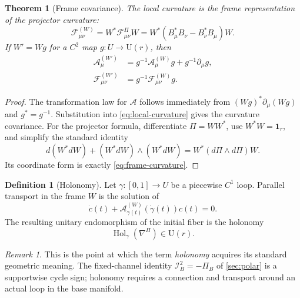 \documentclass[11pt,reqno]{scrartcl}
\newcommand{\idop}{\mathbf 1}
\newcommand{\gaugeA}{\mathcal A}
\newcommand{\gaugeF}{\mathcal F}
\theoremstyle{plain}
\newtheorem{theorem}{Theorem}[section]
\theoremstyle{definition}
\newtheorem{definition}[definition]{Definition}
\theoremstyle{remark}
\newtheorem{remark}[remark]{Remark}
\begin{document}
\begin{theorem}[Frame covariance]
\label{thm:frame-covariance}
The local curvature is the frame representation of the projector curvature:
\begin{equation}
  \boxed{
  \gaugeF_{\mu\nu}^{(W)}
  =W^*\gaugeF_{\mu\nu}^{\Pi}W
  =W^*(B_\mu^*B_\nu-B_\nu^*B_\mu)W.}
  \label{eq:frame-curvature}
\end{equation}
If \(W'=Wg\) for a \(C^2\) map \(g:U\to\mathrm U(r)\), then
\begin{align}
  \gaugeA_\mu^{(W')}
  &=g^{-1}\gaugeA_\mu^{(W)}g+g^{-1}\partial_\mu g,
  \label{eq:gauge-transform-A}\\
  \gaugeF_{\mu\nu}^{(W')}
  &=g^{-1}\gaugeF_{\mu\nu}^{(W)}g.
  \label{eq:gauge-transform-F}
\end{align}
\end{theorem}

\begin{proof}
The transformation law for \(\gaugeA\) follows immediately from
\((Wg)^*\partial_\mu(Wg)\) and \(g^*=g^{-1}\).  Substitution into
\eqref{eq:local-curvature} gives the curvature covariance.  For the projector
formula, differentiate \(\Pi=WW^*\), use \(W^*W=\idop_r\), and simplify the
standard identity
\begin{equation}
  d(W^*dW)+(W^*dW)\wedge(W^*dW)
  =W^*(d\Pi\wedge d\Pi)W.
\end{equation}
Its coordinate form is exactly \eqref{eq:frame-curvature}.
\end{proof}

\begin{definition}[Holonomy]
\label{def:holonomy}
Let \(\gamma:[0,1]\to U\) be a piecewise \(C^1\) loop.  Parallel transport in
the frame \(W\) is the solution of
\begin{equation}
  \dot c(t)+\gaugeA^{(W)}_{\gamma(t)}(\dot\gamma(t))c(t)=0.
  \label{eq:parallel-transport}
\end{equation}
The resulting unitary endomorphism of the initial fiber is the holonomy
\begin{equation}
  \operatorname{Hol}_\gamma(\nabla^\Pi)\in\mathrm U(r).
  \label{eq:holonomy}
\end{equation}
\end{definition}

\begin{remark}
This is the point at which the term \emph{holonomy} acquires its standard
geometric meaning.  The fixed-channel identity \(\mathcal I_B^2=-\Pi_B\) of
\cref{sec:polar} is a supportwise cycle sign; holonomy requires a connection
and transport around an actual loop in the base manifold.
\end{remark}
\end{document}
